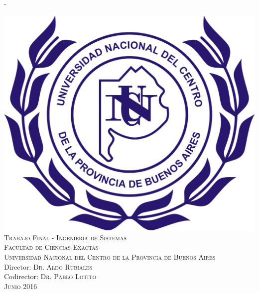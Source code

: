\begin{titlingpage}
\begin{SingleSpace}
\begin{adjustwidth*}{\unitlength}{-\unitlength}
\begin{center}
\includegraphics[scale=0.6]{logos/uncpba_color.jpg}\\
\vspace{6mm}
{\large \textsc{Trabajo Final - Ingeniería de Sistemas }\\
\large \textsc {Facultad de Ciencias Exactas}\\
\textsc{Universidad Nacional del Centro de la Provincia de Buenos Aires}}\\
\vspace{12mm}
Director: \textsc {Dr. Aldo Rubiales} \\ 
Codirector: \textsc {Dr. Pablo Lotito}\\
\vspace{12mm}
{\large\textsc{Junio 2016}}
\vspace{12mm}
\end{center}
\begin{flushright}

\end{flushright}
\end{adjustwidth*}
\end{SingleSpace}
\end{titlingpage}